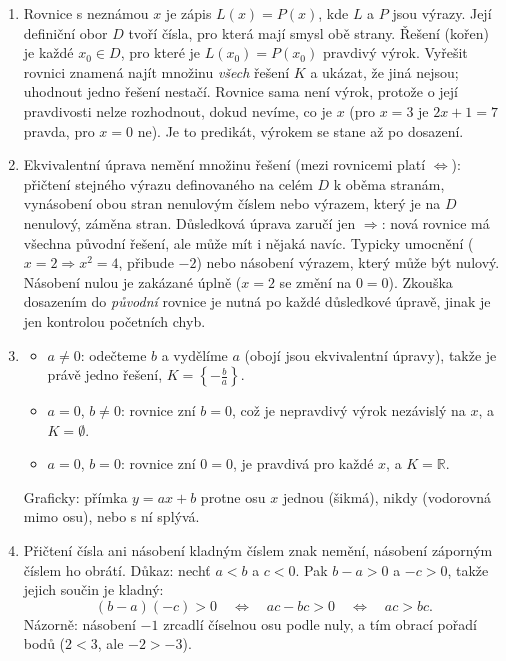 \begin{enumerate}[label=\textbf{\arabic*.}, leftmargin=*, itemsep=0.8em]
  \item {}
  Rovnice s neznámou $x$ je zápis $L(x) = P(x)$, kde $L$ a $P$ jsou výrazy. Její definiční obor $D$ tvoří čísla, pro která mají smysl obě strany. Řešení (kořen) je každé $x_0\in D$, pro které je $L(x_0) = P(x_0)$ pravdivý výrok. Vyřešit rovnici znamená najít množinu \emph{všech} řešení $K$ a ukázat, že jiná nejsou; uhodnout jedno řešení nestačí. Rovnice sama není výrok, protože o její pravdivosti nelze rozhodnout, dokud nevíme, co je $x$ (pro $x = 3$ je $2x + 1 = 7$ pravda, pro $x = 0$ ne). Je to predikát, výrokem se stane až po dosazení. 

  \item {}
  Ekvivalentní úprava nemění množinu řešení (mezi rovnicemi platí $\Leftrightarrow$): přičtení stejného výrazu definovaného na celém $D$ k oběma stranám, vynásobení obou stran nenulovým číslem nebo výrazem, který je na $D$ nenulový, záměna stran. Důsledková úprava zaručí jen $\Rightarrow$: nová rovnice má všechna původní řešení, ale může mít i nějaká navíc. Typicky umocnění ($x = 2 \Rightarrow x^2 = 4$, přibude $-2$) nebo násobení výrazem, který může být nulový. Násobení nulou je zakázané úplně ($x = 2$ se změní na $0 = 0$). Zkouška dosazením do \emph{původní} rovnice je nutná po každé důsledkové úpravě, jinak je jen kontrolou početních chyb.

  \item {}
  \begin{itemize}
    \item $a\neq 0$: odečteme $b$ a vydělíme $a$ (obojí jsou ekvivalentní úpravy), takže je právě jedno řešení, $K = \left\{-\frac{b}{a}\right\}$.
    \item $a = 0$, $b\neq 0$: rovnice zní $b = 0$, což je nepravdivý výrok nezávislý na $x$, a $K = \emptyset$.
    \item $a = 0$, $b = 0$: rovnice zní $0 = 0$, je pravdivá pro každé $x$, a $K = \mathbb{R}$.
  \end{itemize}
  Graficky: přímka $y = ax + b$ protne osu $x$ jednou (šikmá), nikdy (vodorovná mimo osu), nebo s ní splývá. 

  \item {}
  Přičtení čísla ani násobení kladným číslem znak nemění, násobení záporným číslem ho obrátí. Důkaz: nechť $a < b$ a $c < 0$. Pak $b - a > 0$ a $-c > 0$, takže jejich součin je kladný:
  \begin{equation*}
    (b - a)(-c) > 0 \quad\Leftrightarrow\quad ac - bc > 0 \quad\Leftrightarrow\quad ac > bc.
  \end{equation*}
  Názorně: násobení $-1$ zrcadlí číselnou osu podle nuly, a tím obrací pořadí bodů ($2 < 3$, ale $-2 > -3$). 


\end{enumerate}
